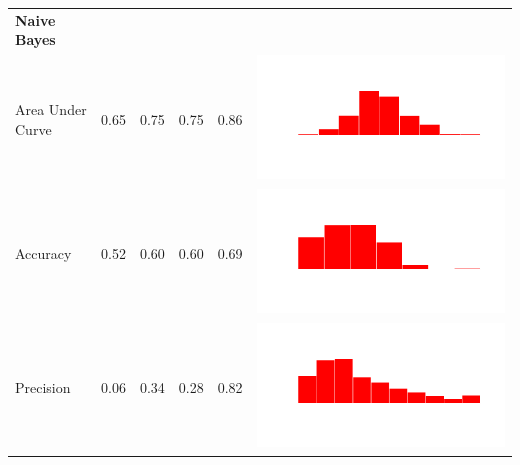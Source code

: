 \documentclass[conference]{IEEEtran}
\begin{document}
\begin{table}
\begin{tabular}{lrrrrc}
    \bf{Naive Bayes}\\
    Area Under Curve & 0.65 & 0.75 & 0.75 & 0.86 & \includegraphics[scale = 0.1, clip = true, trim= 50px 60px 50px 60px]{../figs/hist-results/hist-NBauc.pdf} \\
    Accuracy & 0.52 & 0.60 & 0.60 & 0.69 & \includegraphics[scale = 0.1, clip = true, trim= 50px 60px 50px 60px]{../figs/hist-results/hist-NBacc.pdf} \\
    Precision & 0.06 & 0.34 & 0.28 & 0.82 & \includegraphics[scale = 0.1, clip = true, trim= 50px 60px 50px 60px]{../figs/hist-results/hist-NBprec.pdf} \\

\end{tabular}
\end{table}
\end{document}
